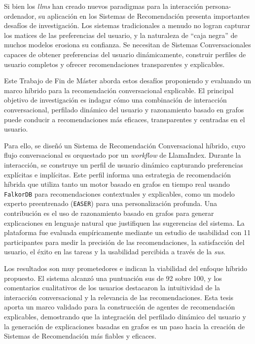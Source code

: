 Si bien los \textit{\acp{llm}} han creado nuevos paradigmas para la interacción persona-ordenador, su aplicación en los Sistemas de Recomendación presenta importantes desafíos de investigación. Los sistemas tradicionales a menudo no logran capturar los matices de las preferencias del usuario, y la naturaleza de ``caja negra'' de muchos modelos erosiona su confianza. Se necesitan de Sistemas Conversacionales capaces de obtener preferencias del usuario dinámicamente, construir perfiles de usuario completos y ofrecer recomendaciones transparentes y explicables.

Este Trabajo de Fin de Máster aborda estos desafíos proponiendo y evaluando un marco híbrido para la recomendación conversacional explicable. El principal objetivo de investigación es indagar cómo una combinación de interacción conversacional, perfilado dinámico del usuario y razonamiento basado en grafos puede conducir a recomendaciones más eficaces, transparentes y centradas en el usuario.

Para ello, se diseñó un Sistema de Recomendación Conversacional híbrido, cuyo flujo conversacional es orquestado por un \textit{workflow} de LlamaIndex. Durante la interacción, se construye un perfil de usuario dinámico capturando preferencias explícitas e implícitas. Este perfil informa una estrategia de recomendación híbrida que utiliza tanto un motor basado en grafos en tiempo real usando \texttt{FalkorDB} para recomendaciones contextuales y explicables, como un modelo experto preentrenado (\texttt{EASER}) para una personalización profunda. Una contribución es el uso de razonamiento basado en grafos para generar explicaciones en lenguaje natural que justifiquen las sugerencias del sistema. La plataforma fue evaluada empíricamente mediante un estudio de usabilidad con 11 participantes para medir la precisión de las recomendaciones, la satisfacción del usuario, el éxito en las tareas y la usabilidad percibida a través de la \textit{\ac{sus}}.

Los resultados son muy prometedores e indican la viabilidad del enfoque híbrido propuesto. El sistema alcanzó una puntuación \acs{sus} de 92 sobre 100, y los comentarios cualitativos de los usuarios destacaron la intuitividad de la interacción conversacional y la relevancia de las recomendaciones. Esta tesis aporta un marco validado para la construcción de agentes de recomendación explicables, demostrando que la integración del perfilado dinámico del usuario y la generación de explicaciones basadas en grafos es un paso hacia la creación de Sistemas de Recomendación más fiables y eficaces.

